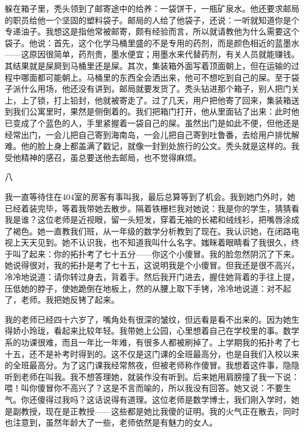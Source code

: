 躲在箱子里，秃头领到了邮寄途中的给养：一袋饼干，一瓶矿泉水。他还要求邮局的职员给他一个坚固的塑料袋子。邮局的人给了他袋子，还说：一听就知道你是个专递油子。我想这是指他常被邮寄，颇有经验而言，所以就请教他为什么需要这个袋子。他说：首先，这个化学马桶里盛的不是专用的药剂，而是颜色相近的蓝墨水 ——这原因很简单，药剂贵，墨水便宜；用墨水来代替药剂，有关人员就能赚钱。其结果就是屎屙到马桶里还是屎。其次，集装箱外面写着顶面朝上，但在运输的过程中哪面都可能朝上。马桶里的东西全会洒出来，他可不想吃到自己的屎。至于袋子派什么用场，他还没有讲到，邮局就要发货了。秃头钻进那个箱子，别人把门关上，上了锁，打上铅封，他就被寄走了。过了几天，用户把他寄了回来，集装箱送到我们公寓里时，果然是侧倒着的。我们把箱门打开，他从里面钻了出来：此时他已变成了个蓝色的人，手里紧握着一袋自己的屎。虽然出门是如此不便，但他还是经常出门，一会儿把自己寄到海南岛，一会儿把自己寄到吐鲁番，去给用户排忧解难。他的脸上身上都盖满了戳记，就像一封到处旅行的公文。秃头就是这样的。我受他精神的感召，虽总要送他去邮局，也不觉得麻烦。 



八 

我一直等待住在404室的房客有事叫我，最后总算等到了机会。我到她门外时，她已经着装完毕，等着我带她去散步。隔着铁栅栏我对她说：我是你的学生，猜猜看我是谁？这位老师是近视眼，留一头短发，穿着无袖的长裙和绒线衫，把嘴唇涂成了褐色。她一直教我们班，从一年级的数学分析教到了现在。我认识她，在闭路电视上天天见到。她不认识我，也不知道我叫什么名字。媸眯着眼睛看了我很久，终于叫了起来：你的拓扑考了七十五分——你这个小傻冒。我的脸忽然阴沉了下来。她说得很对，我的拓扑是考了七十五，这说明我是个小傻冒。但我还是很不高兴，冷冷地说道：请你转过身去，背着手。然后我开门进去，握住她背着的手往上提，压低她的脖子，使她跪倒在地板上，然的从腰上取下手铐，冷冷地说道：对不起了，老师。我把她反铐了起来。 

我的老师已经四十六岁了，嘴角处有很深的皱纹，但远看是看不出来的。因为她生得娇小玲珑，看起来比较年轻。我带她上公园，心里想着自己在学校里的事。数学系的功课很难，而且一年比一年难，有很多人都被刷掉了。上学期我的拓扑考了七十五，还不是补考时得到的。这不仅是这门课的全班最高分，也是自我们入校以来的全班最高分。为了这门课我经常熬夜，但被老师称作傻冒。我想着这件事，隐隐听到老师在叫我。我不想答理她，就装作没有听到。后来她用肩膀撞了我一下说：喂！叫你傻冒你不高兴了？这是不言而喻的，所以我没有回答。她又说：不要生气。你还傻得过我吗？这话说得有道理。这位老师是数学博士，我们刚入学时，她是副教授，现在是正教授——这些都是她比我傻的证明。我的火气正在散去，同时也注意到，虽然年龄大了一些，老师依然是有魅力的女人。 

